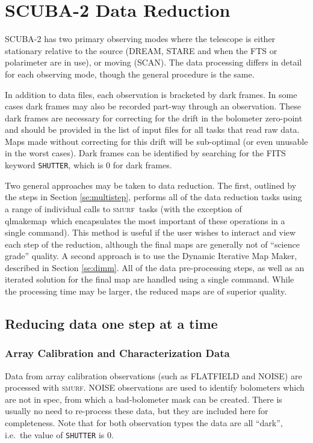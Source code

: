 \documentclass[twoside,11pt]{article}
\newcommand{\xref}[3]{#1}
\newcommand{\xlabel}[1]{}
\renewcommand{\_}{\texttt{\symbol{95}}}
\newcommand{\SMURF}{\textsc{smurf}}
\newcommand{\task}[1]{\textsf{#1}}
\newcommand{\qlmakemap}{\xref{\task{qlmakemap}}{sun258}{QLMAKEMAP}}
\begin{document}
\section{\xlabel{scuba2}SCUBA-2 Data Reduction\label{se:sc2dr}}

SCUBA-2 has two primary observing modes where the telescope is either
stationary relative to the source (DREAM, STARE and when the FTS or
polarimeter are in use), or moving (SCAN). The data processing differs
in detail for each observing mode, though the general procedure is the
same.

In addition to data files, each observation is bracketed by dark
frames. In some cases dark frames may also be recorded part-way
through an observation. These dark frames are necessary for correcting
for the drift in the bolometer zero-point and should be provided in
the list of input files for all tasks that read raw data. Maps made
without correcting for this drift will be sub-optimal (or even
unusable in the worst cases). Dark frames can be identified by
searching for the FITS keyword \texttt{SHUTTER}, which is 0 for dark
frames.

Two general approaches may be taken to data reduction. The first,
outlined by the steps in Section \ref{se:multistep}, performs all of
the data reduction tasks using a range of individual calls to \SMURF\
tasks (with the exception of \qlmakemap\ which encapsulates the most
important of these operations in a single command). This method is
useful if the user wishes to interact and view each step of the
reduction, although the final maps are generally not of ``science
grade'' quality. A second approach is to use the Dynamic Iterative Map
Maker, described in Section \ref{se:dimm}. All of the data
pre-processing steps, as well as an iterated solution for the final
map are handled using a single command. While the processing time may
be larger, the reduced maps are of superior quality.

\subsection{\xlabel{multistep}\label{se:multistep}Reducing data one
  step at a time}

\subsubsection{\xlabel{arraycal}Array Calibration and Characterization Data\label{se:arraycal}}

Data from array calibration observations (such as FLATFIELD and NOISE)
are processed with \SMURF. NOISE observations are used to identify
bolometers which are not in spec, from which a bad-bolometer mask can
be created. There is usually no need to re-process these data, but
they are included here for completeness. Note that for both
observation types the data are all ``dark'', i.e.\ the value of
\texttt{SHUTTER} is 0.
\end{document}
